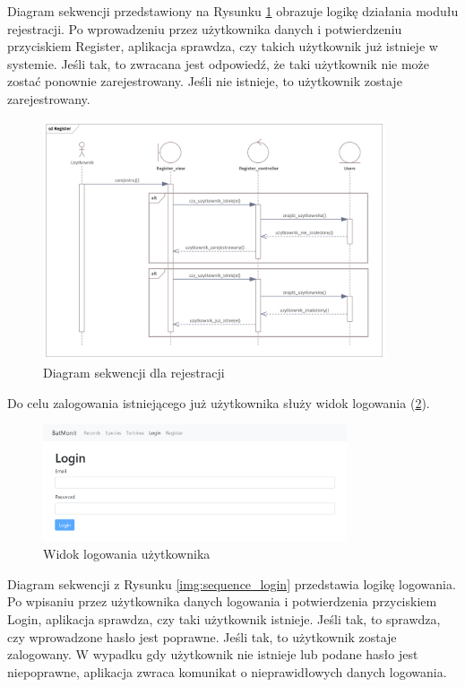 \documentclass{sprz}
\begin{document}
Diagram sekwencji przedstawiony na Rysunku \ref{img:sequence_register} obrazuje logikę działania modułu rejestracji. Po wprowadzeniu przez użytkownika danych i potwierdzeniu przyciskiem Register, aplikacja sprawdza, czy takich użytkownik już istnieje w systemie. Jeśli tak, to zwracana jest odpowiedź, że taki użytkownik nie może zostać ponownie zarejestrowany. Jeśli nie istnieje, to użytkownik zostaje zarejestrowany.

\begin{figure}[h]
  \centering
  \includegraphics[width=0.9\textwidth]{sprz/sequence_register}
  \caption{Diagram sekwencji dla rejestracji}
  \label{img:sequence_register}
\end{figure}

Do celu zalogowania istniejącego już użytkownika służy widok logowania (\ref{img:app_login}).
\begin{figure}[h]
  \centering
  \includegraphics[width=0.8\textwidth]{sprz/app_login}
  \caption{Widok logowania użytkownika}
  \label{img:app_login}
\end{figure}

Diagram sekwencji z Rysunku \ref{img:sequence_login} przedstawia logikę logowania. Po wpisaniu przez użytkownika danych logowania i potwierdzenia przyciskiem Login, aplikacja sprawdza, czy taki użytkownik istnieje. Jeśli tak, to sprawdza, czy wprowadzone hasło jest poprawne. Jeśli tak, to użytkownik zostaje zalogowany. W wypadku gdy użytkownik nie istnieje lub podane hasło jest niepoprawne, aplikacja zwraca komunikat o nieprawidłowych danych logowania.
\end{document}
